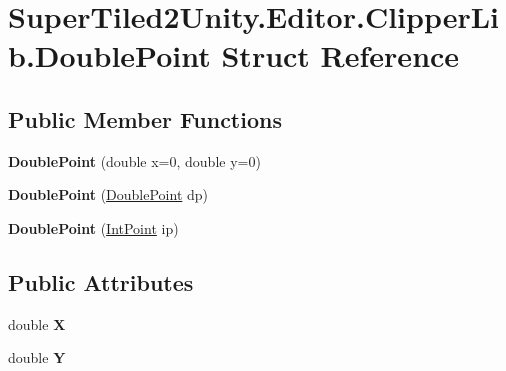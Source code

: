 \hypertarget{struct_super_tiled2_unity_1_1_editor_1_1_clipper_lib_1_1_double_point}{}\section{Super\+Tiled2\+Unity.\+Editor.\+Clipper\+Lib.\+Double\+Point Struct Reference}
\label{struct_super_tiled2_unity_1_1_editor_1_1_clipper_lib_1_1_double_point}
\subsection*{Public Member Functions}
\begin{DoxyCompactItemize}
\item 
\mbox{\label{struct_super_tiled2_unity_1_1_editor_1_1_clipper_lib_1_1_double_point_a239ab3da24832a03f235059278302277}} 
{\bfseries Double\+Point} (double x=0, double y=0)
\item 
\mbox{\label{struct_super_tiled2_unity_1_1_editor_1_1_clipper_lib_1_1_double_point_a3b4acbe0ea5e76769ce96e1378ab884a}} 
{\bfseries Double\+Point} (\mbox{\hyperlink{struct_super_tiled2_unity_1_1_editor_1_1_clipper_lib_1_1_double_point}{Double\+Point}} dp)
\item 
\mbox{\label{struct_super_tiled2_unity_1_1_editor_1_1_clipper_lib_1_1_double_point_a9cceb7e5084e317df2413c7a53086b64}} 
{\bfseries Double\+Point} (\mbox{\hyperlink{struct_super_tiled2_unity_1_1_editor_1_1_clipper_lib_1_1_int_point}{Int\+Point}} ip)
\end{DoxyCompactItemize}
\subsection*{Public Attributes}
\begin{DoxyCompactItemize}
\item 
\mbox{\label{struct_super_tiled2_unity_1_1_editor_1_1_clipper_lib_1_1_double_point_ab13a93ed46adcf16bb5b1ffb29ca041e}} 
double {\bfseries X}
\item 
\mbox{\label{struct_super_tiled2_unity_1_1_editor_1_1_clipper_lib_1_1_double_point_ad3ca2b4fc2fdf74335c84b4a73d693f0}} 
double {\bfseries Y}
\end{DoxyCompactItemize}


